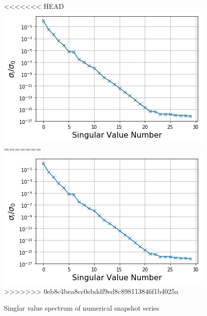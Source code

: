 \documentclass{style/nseJournal}
\newcommand{\LFI}[1]{\label{fi:#1}}
\newcommand{\bfg}{\begin{figure}}
\newcommand{\efg}{\end{figure}}
\begin{document}
\bfg[h] \centering
<<<<<<< HEAD
	\includegraphics[scale=0.5]{figures/singularValueSpectrum_flux.jpg}
=======
	\includegraphics[scale=0.5]{figures/singularValueSpectrum_flux.png}
>>>>>>> 0eb8c4bea8cc0ebddf9ed8c898113846f1b4025a
	\caption{Singlar value spectrum of numerical snapshot series}
	\LFI{sv-spec}
\efg
\end{document}
